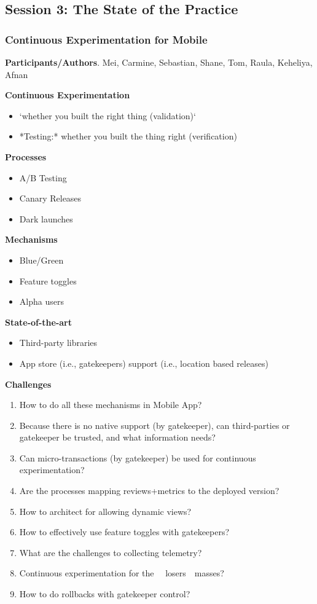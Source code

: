 \documentclass[a4paper]{article}
\newcommand{\smallsection}[1]{\noindent \textbf{#1}. }
\begin{document}
\subsection{Session 3: The State of the Practice}

\subsubsection{Continuous Experimentation for Mobile}


\smallsection{Participants/Authors}
Mei, Carmine, Sebastian, Shane, Tom, Raula, Keheliya, Afnan

\textbf{Continuous Experimentation}

\begin{itemize}
\item`whether you built the right thing (validation)`
\item *Testing:* whether you built the thing right (verification)
\end{itemize}

\textbf{Processes}
\begin{itemize}
\item A/B Testing
\item Canary Releases
\item Dark launches
\end{itemize}

\textbf{Mechanisms}
\begin{itemize}
\item Blue/Green
\item Feature toggles
\item Alpha users
\end{itemize}

\textbf{State-of-the-art}
\begin{itemize}
\item Third-party libraries
\item App store (i.e., gatekeepers) support (i.e., location based releases)
\end{itemize}

\textbf{Challenges}
\begin{enumerate}
\item How to do all these mechanisms in Mobile App?
\item Because there is no native support (by gatekeeper), can third-parties or gatekeeper be trusted, and what information needs?
\item Can micro-transactions (by gatekeeper) be used for continuous experimentation?
\item Are the processes mapping reviews+metrics to the deployed version?
\item How to architect for allowing dynamic views?
\item How to effectively use feature toggles with gatekeepers?
\item What are the challenges to collecting telemetry?
\item Continuous experimentation for the ~~losers~~masses?
\item How to do rollbacks with gatekeeper control?
\end{enumerate}
\end{document}
